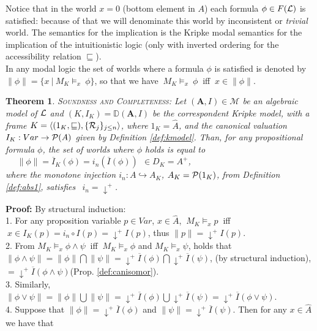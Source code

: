 \documentclass[10pt,twocolumn]{article}
\newcommand{\M}{\mathcal{M}} \newcommand{\N}{\mathcal{N}}
\newtheorem{theo}{Theorem}
\begin{document}
Notice that in the world $x = 0$ (bottom element in $A$) each
formula $\phi \in F(\L)$ is satisfied: because of that we will
denominate this world by inconsistent or \emph{trivial} world. The
semantics for the implication is the Kripke modal semantics for the
implication of the intuitionistic logic (only with inverted ordering
for the accessibility relation $\sqsubseteq$).\\ In any modal logic
the set of worlds where a formula $\phi$ is satisfied is denoted by
$\| \phi \| = \{ x~| ~M_K \models_x ~\phi \}$, so that we have $~M_K
\models_x ~\phi~$ iff $~ x \in \| \phi \|$.
 \begin{theo}\label{th:kmodel} \textsc{Soundness and Completeness:}
 Let  $(\textbf{A},I) \in \M $ be an algebraic model of $\L$ and
$(K,I_K) = \mathbb{D}(\textbf{A},I)$ be the correspondent
  Kripke model, with a frame
$K = \langle (1_K, \sqsubseteq), \{\R_j\}_{j \leq n} \rangle$, where
$1_K = \widehat{A}$, and the canonical valuation $I_K:Var\rightarrow
\P(A)$ given by Definition \ref{def:kmodel}. Than, for any
propositional
formula $\phi$, the set of worlds where $\phi$ holds is equal to \\
$~~~~~~\| \phi \| = \overline{I}_K(\phi) = i_n(\overline{I}(\phi))
~~\in D_K = A^+$,\\
where the monotone injection $i_n:A \hookrightarrow A_K$, $A_K =
\P(1_K)$, from Definition \ref{def:abs1}, satisfies $~~i_n =
\downarrow^+ $.
\end{theo}
\textbf{Proof:} By structural induction: \\
1. For any proposition variable $p \in Var$, $x \in \widehat{A}$,
$~M_K \models_x p~$ iff $~x \in I_K(p) = i_n \circ I(p) =
\downarrow^+
I(p)$, thus $\|p\| = \downarrow^+ I(p)$.\\
 2. From $M_K \models_x
\phi \wedge \psi~$ iff $~M_K \models_x \phi$ and $M_K \models_x
\psi$, holds that $\| \phi \wedge \psi\| = \| \phi\| \bigcap \| \psi
\|= \downarrow^+ \overline{I}(\phi) \bigcap \downarrow^+
\overline{I}( \psi)$, (by structural induction), $ = \downarrow^+
\overline{I}(\phi \wedge \psi)$(Prop.
\ref{def:canisomor}).\\
3.  Similarly, $\| \phi \vee \psi\| = \| \phi\| \bigcup \| \psi \| =
\downarrow^+ \overline{I}(\phi) \bigcup \downarrow^+ \overline{I}(
\psi) = \downarrow^+ \overline{I}(\phi
\vee \psi)$.\\
4. Suppose that $\| \phi \| = \downarrow^+ \overline{I}(\phi)$ and
$\|
\psi \| = \downarrow^+ \overline{I}(\psi)$. Then for any $x \in \widehat{A}$ we have that\\
\end{document}
